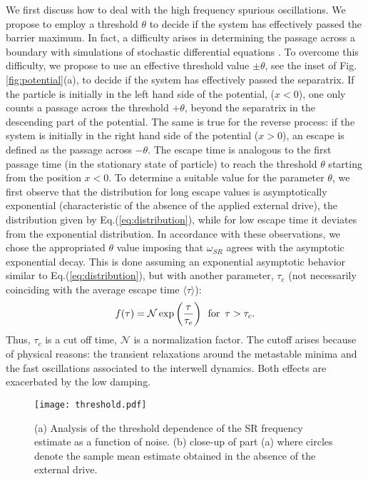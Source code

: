 \documentclass[conference]{IEEEtran}
\newcommand{\beq}{\begin{equation}}
\newcommand{\eeq}{\end{equation}}
\begin{document}
We first discuss how to deal with the high frequency spurious oscillations. We propose to employ a threshold $\theta$ to decide if the system has effectively passed the barrier maximum. 
In fact, a difficulty arises in determining the passage across a boundary with simulations of  stochastic differential equations \cite{Mannella01}. 
To overcome this difficulty, we propose to use an effective threshold value $\pm \theta$,  see the inset of Fig. \ref{fig:potential}(a), to decide if the system has effectively passed the separatrix. 
If the particle is initially in the left hand side of the potential, ($x<0$), one only counts a passage across the threshold $+\theta$, beyond the separatrix in the descending part of the potential. 
The same is true for the reverse process: if the system is initially in the right hand side of the potential ($x>0$), an escape is defined as the passage across $-\theta$.
The escape time is analogous to the first passage time  (in the stationary state of particle) to reach the threshold $\theta$ starting from the position $x<0$.
To determine a suitable value for the parameter $\theta$, we first observe that the distribution for long escape values is asymptotically  exponential (characteristic of the absence of the applied external drive), the distribution given by Eq.(\ref{eq:distribution}), while for low escape time it deviates from the exponential distribution.
In accordance with these observations, we chose the appropriated $\theta$ value imposing that $\omega_{SR}$  agrees with the asymptotic exponential decay.
This is done assuming an exponential asymptotic behavior similar to Eq.(\ref{eq:distribution}), but with another  parameter, $\tau_e$ (not necessarily coinciding with the average escape time $\langle \tau \rangle $):
\beq
f(\tau) = {\mathcal N } \exp \left( \frac{\tau}{\tau_e}\right) \,\,\, {\rm for} \,\,\,  \tau > \tau_c.
\label{eq:fitting}
\eeq
Thus, $\tau_c $ is a cut off time, ${\mathcal N}$ is a normalization factor. The cutoff arises because of physical reasons: the transient relaxations \cite{Lanzara97} around the metastable minima and  the fast oscillations associated to the interwell dynamics. Both effects are exacerbated by the low damping. 

\begin{figure}
\centerline{\texttt{[image: threshold.pdf]}}
\caption{
(a) Analysis of the threshold dependence of the SR frequency estimate as a function of noise. 
(b) close-up of part (a) where circles denote the sample mean estimate obtained in the absence of the external drive.}
\label{fig:threshold}
\end{figure}
\end{document}
